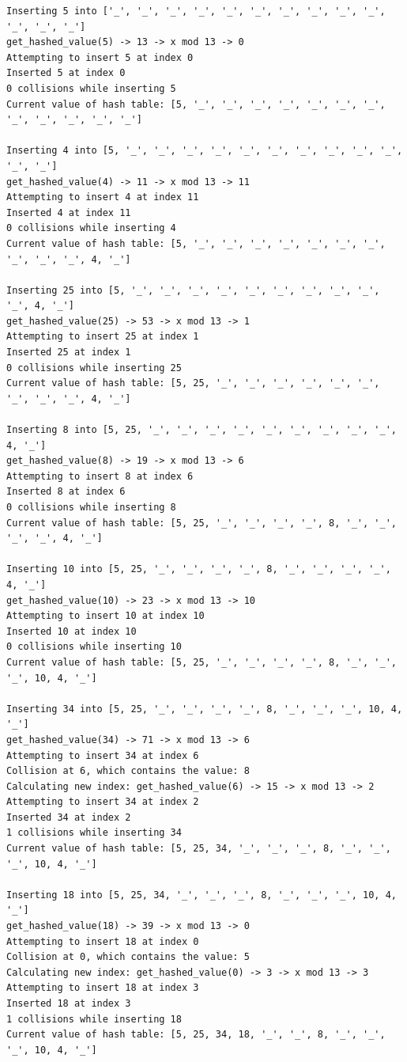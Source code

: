 \documentclass[10pt,letterpaper,final]{report}
\begin{document}
\begin{verbatim}
Inserting 5 into ['_', '_', '_', '_', '_', '_', '_', '_', '_', '_', '_', '_', '_']
get_hashed_value(5) -> 13 -> x mod 13 -> 0
Attempting to insert 5 at index 0
Inserted 5 at index 0
0 collisions while inserting 5
Current value of hash table: [5, '_', '_', '_', '_', '_', '_', '_', '_', '_', '_', '_', '_']

Inserting 4 into [5, '_', '_', '_', '_', '_', '_', '_', '_', '_', '_', '_', '_']
get_hashed_value(4) -> 11 -> x mod 13 -> 11
Attempting to insert 4 at index 11
Inserted 4 at index 11
0 collisions while inserting 4
Current value of hash table: [5, '_', '_', '_', '_', '_', '_', '_', '_', '_', '_', 4, '_']

Inserting 25 into [5, '_', '_', '_', '_', '_', '_', '_', '_', '_', '_', 4, '_']
get_hashed_value(25) -> 53 -> x mod 13 -> 1
Attempting to insert 25 at index 1
Inserted 25 at index 1
0 collisions while inserting 25
Current value of hash table: [5, 25, '_', '_', '_', '_', '_', '_', '_', '_', '_', 4, '_']

Inserting 8 into [5, 25, '_', '_', '_', '_', '_', '_', '_', '_', '_', 4, '_']
get_hashed_value(8) -> 19 -> x mod 13 -> 6
Attempting to insert 8 at index 6
Inserted 8 at index 6
0 collisions while inserting 8
Current value of hash table: [5, 25, '_', '_', '_', '_', 8, '_', '_', '_', '_', 4, '_']

Inserting 10 into [5, 25, '_', '_', '_', '_', 8, '_', '_', '_', '_', 4, '_']
get_hashed_value(10) -> 23 -> x mod 13 -> 10
Attempting to insert 10 at index 10
Inserted 10 at index 10
0 collisions while inserting 10
Current value of hash table: [5, 25, '_', '_', '_', '_', 8, '_', '_', '_', 10, 4, '_']

Inserting 34 into [5, 25, '_', '_', '_', '_', 8, '_', '_', '_', 10, 4, '_']
get_hashed_value(34) -> 71 -> x mod 13 -> 6
Attempting to insert 34 at index 6
Collision at 6, which contains the value: 8
Calculating new index: get_hashed_value(6) -> 15 -> x mod 13 -> 2
Attempting to insert 34 at index 2
Inserted 34 at index 2
1 collisions while inserting 34
Current value of hash table: [5, 25, 34, '_', '_', '_', 8, '_', '_', '_', 10, 4, '_']

Inserting 18 into [5, 25, 34, '_', '_', '_', 8, '_', '_', '_', 10, 4, '_']
get_hashed_value(18) -> 39 -> x mod 13 -> 0
Attempting to insert 18 at index 0
Collision at 0, which contains the value: 5
Calculating new index: get_hashed_value(0) -> 3 -> x mod 13 -> 3
Attempting to insert 18 at index 3
Inserted 18 at index 3
1 collisions while inserting 18
Current value of hash table: [5, 25, 34, 18, '_', '_', 8, '_', '_', '_', 10, 4, '_']


\end{verbatim}
\end{document}
